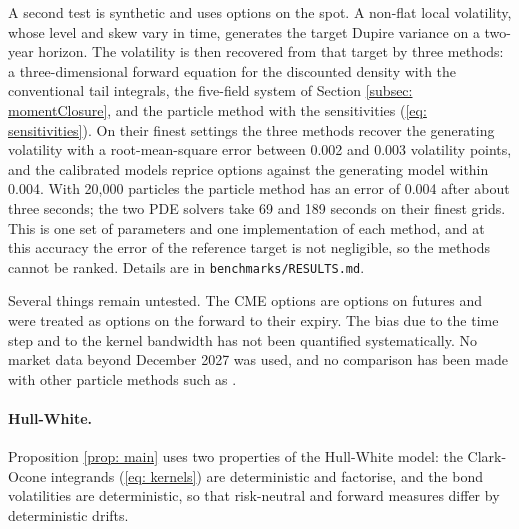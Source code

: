 A second test is synthetic and uses options on the spot. A non-flat local volatility, whose level and skew vary in time, generates the target Dupire variance on a two-year horizon. The volatility is then recovered from that target by three methods: a three-dimensional forward equation for the discounted density with the conventional tail integrals, the five-field system of Section \ref{subsec: momentClosure}, and the particle method with the sensitivities (\ref{eq: sensitivities}). On their finest settings the three methods recover the generating volatility with a root-mean-square error between 0.002 and 0.003 volatility points, and the calibrated models reprice options against the generating model within 0.004. With 20,000 particles the particle method has an error of 0.004 after about three seconds; the two PDE solvers take 69 and 189 seconds on their finest grids. This is one set of parameters and one implementation of each method, and at this accuracy the error of the reference target is not negligible, so the methods cannot be ranked. Details are in \texttt{benchmarks/RESULTS.md}.

Several things remain untested. The CME options are options on futures and were treated as options on the forward to their expiry. The bias due to the time step and to the kernel bandwidth has not been quantified systematically. No market data beyond December 2027 was used, and no comparison has been made with other particle methods such as \cite{cozma,ogetbilHientzsch}.

\paragraph{Hull-White.} Proposition \ref{prop: main} uses two properties of the Hull-White model: the Clark-Ocone integrands (\ref{eq: kernels}) are deterministic and factorise, and the bond volatilities are deterministic, so that risk-neutral and forward measures differ by deterministic drifts.

